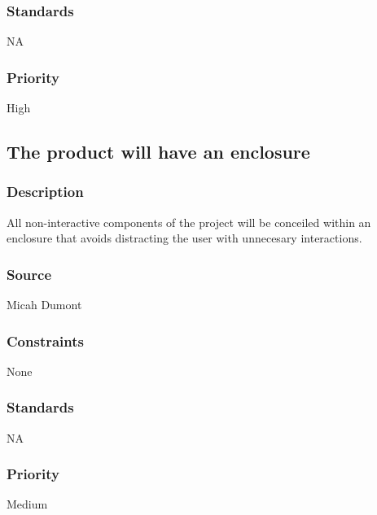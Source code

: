 \subsubsection{Standards}
NA
\subsubsection{Priority}
High

\subsection{The product will have an enclosure}
\subsubsection{Description}
All non-interactive components of the project will be conceiled within an enclosure that avoids distracting the user with unnecesary interactions.
\subsubsection{Source}
Micah Dumont
\subsubsection{Constraints}
None
\subsubsection{Standards}
NA
\subsubsection{Priority}
Medium
